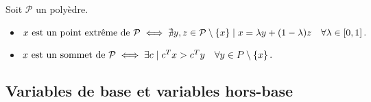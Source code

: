 	Soit $\mathcal{P}$ un polyèdre.

	\begin{itemize}
		\item $\textnormal{$x$ est un point extrême de $\mathcal{P}$}
		\iff \nexists y,z \in \mathcal{P} \setminus \{x\} \suchthat x = \lambda y + (1 - \lambda) z
		\quad \forall \lambda \in \interval{0}{1}\,.$

		\item $\textnormal{$x$ est un sommet de $\mathcal{P}$}
		\iff \exists c \suchthat c^T x > c^T y
		\quad \forall y \in P \setminus \{x\} \,.$
	\end{itemize}

\subsection{Variables de base et variables hors-base}
